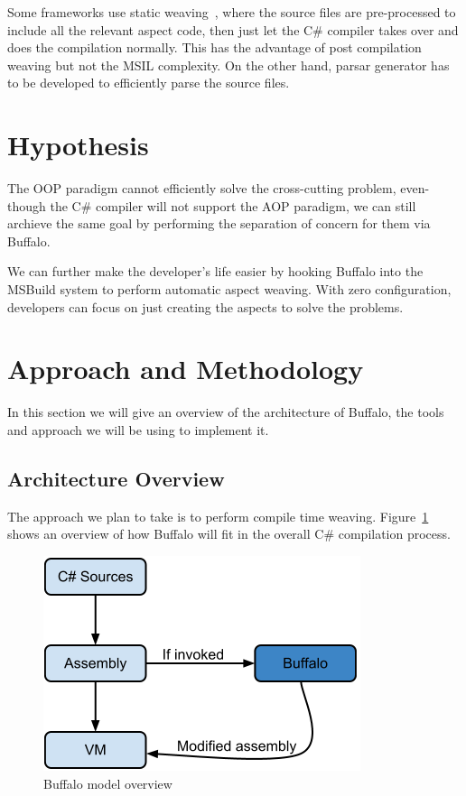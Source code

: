 Some frameworks use static weaving~\cite{aspectcs}, where the source files are pre-processed to include all the relevant aspect code, then just let the C\# compiler takes over and does the compilation normally. This has the advantage of post compilation weaving but not the MSIL complexity. On the other hand, parsar generator has to be developed to efficiently parse the source files.

\section{Hypothesis}
The OOP paradigm cannot efficiently solve the cross-cutting problem, even-though the C\# compiler will not support the AOP paradigm, we can still archieve the same goal by performing the separation of concern for them via Buffalo.

We can further make the developer's life easier by hooking Buffalo into the MSBuild system to perform automatic aspect weaving. With zero configuration, developers can focus on just creating the aspects to solve the problems.

\section{Approach and Methodology}
In this section we will give an overview of the architecture of Buffalo, the tools and approach we will be using to implement it.

\subsection{Architecture Overview}
The approach we plan to take is to perform compile time weaving. Figure~\ref{buffalo_model} shows an overview of how Buffalo will fit in the overall C\# compilation process.

\begin{figure}[here]
  \includegraphics[scale=0.70]{model_overview.png}
  \centering
  \caption{Buffalo model overview\label{buffalo_model}}
\end{figure}

